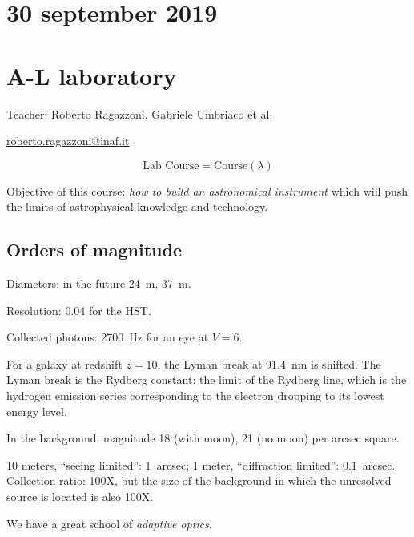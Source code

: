 \documentclass[main.tex]{subfiles}
\begin{document}
\section*{30 september 2019}
\section{A-L laboratory}

Teacher: Roberto Ragazzoni, Gabriele Umbriaco et al.

\url{roberto.ragazzoni@inaf.it}

\begin{equation}
    \text{Lab Course} = \text{Course} (\lambda)
\end{equation}

Objective of this course: \emph{how to build an astronomical instrument} which will push the limits of astrophysical knowledge and technology.

\subsection{Orders of magnitude}

Diameters: in the future \SI{24}{m}, \SI{37}{m}.

Resolution: \SI{0.04}{\arcsec} for the HST.

Collected photons: \SI{2700}{Hz} for an eye at \(V=6\).

For a galaxy at redshift \(z=10\), the Lyman break at \SI{91.4}{nm} is shifted.
The Lyman break is the Rydberg constant: the limit of the Rydberg line, which is the hydrogen emission series corresponding to the electron dropping to its lowest energy level.

In the background: magnitude 18 (with moon), 21 (no moon) per arcsec square.

10 meters, ``seeing limited'': \SI{1}{arcsec}; 1 meter, ``diffraction limited'': \SI{0.1}{arcsec}. Collection ratio: 100X, but the size of the background in which the unresolved source is located is also 100X.

We have a great school of \emph{adaptive optics}.
\end{document}
